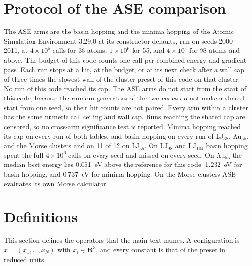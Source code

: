 \documentclass[journal=jctcce,manuscript=suppinfo]{achemso}
\begin{document}
\section{Protocol of the ASE comparison}
\label{sec:si-ase}
The ASE arms are the basin hopping and the minima hopping of the Atomic
Simulation Environment 3.29.0 at its constructor defaults, run on seeds
2000--2011, at \(4\times 10^{5}\) calls for 38 atoms, \(1\times 10^{6}\) for
55, and \(4\times 10^{6}\) for 98 atoms and above.
The budget of this code counts one call per combined energy and gradient pass.
Each run stops at a hit, at the budget, or at its next check after a wall cap
of three times the slowest wall of the cluster preset of this code on that
cluster.
No run of this code reached its cap.
The ASE arms do not start from the start of this code, because the random
generators of the two codes do not make a shared start from one seed, so
their hit counts are not paired.
Every arm within a cluster has the same numeric call ceiling and wall cap.
Runs reaching the shared cap are censored, so no cross-arm significance
test is reported.
Minima hopping reached its cap on every run of both tables, and basin hopping
on every run of LJ\(_{38}\), Au\(_{55}\), and the Morse clusters and on 11
of 12 on LJ\(_{55}\).
On LJ\(_{98}\) and LJ\(_{104}\) basin hopping spent the full
\(4\times 10^{6}\) calls on every seed and missed on every seed.
On Au\(_{55}\) the median best energy lies 0.051~eV above the reference for
this code, 1.232~eV for basin hopping, and 0.737~eV for minima hopping.
On the Morse clusters ASE evaluates its own Morse calculator.

\section{Definitions}
\label{sec:definitions}
This section defines the operators that the main text names.
A configuration is \(x=(x_1,\ldots,x_N)\) with \(x_i\in\mathbf{R}^3\), and
every constant is that of the preset in reduced units.
\end{document}
